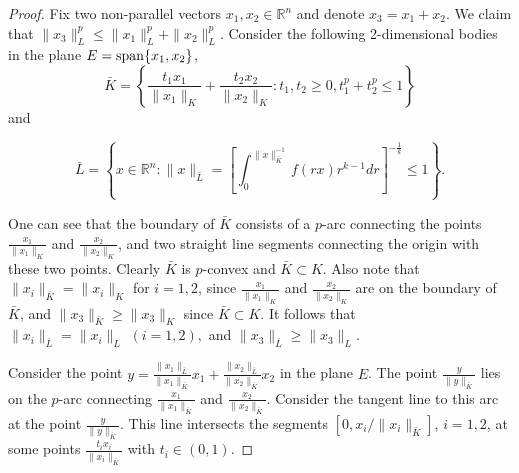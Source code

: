 \documentclass[12pt]{amsart} %
\renewcommand{\[}{\left[}
\renewcommand{\(}{\left(}
\renewcommand{\]}{\right]}
\renewcommand{\)}{\right)}
\renewcommand{\le}{\leqslant}
\renewcommand{\ge}{\geqslant}
\newcommand{\R}{\mathbb R}              %
\begin{document}
\begin{proof}
Fix two non-parallel vectors $x_1,x_2\in\R^n$ and denote $x_3=x_1+x_2$. We claim that $\|x_3\|_L^p \le \|x_1\|_L^p + \|x_2\|_L^p$. Consider the following 2-dimensional bodies in the plane $E={\rm span}\{x_1,x_2\}$,
$$
\bar{K}=\left\{\frac{t_1 x_1}{\|x_1\|_K}+\frac{t_2 x_2}{\|x_2\|_K}: t_1,t_2\ge 0, t_1^p +t_2^p \le 1\right\}
$$
and

 $$
\bar{L}=\left\{x\in\R^n: \|x\|_{\bar L} = \left[\int_0^{\|x\|_{\bar K}^{-1}} f(rx)r^{k-1}dr \right]^{-\frac 1k}\le 1 \right\}.
$$


One can see that the boundary of $\bar K$ consists of  a $p$-arc connecting the points  $\frac{x_1}{\|x_1\|_K}$ and $\frac{x_2}{\|x_2\|_K}$, and two straight line segments connecting the origin with these two points.  Clearly $\bar{K}$ is $p$-convex and $\bar{K}\subset K$. Also note that $\|x_i\|_{\bar K}=\|x_i\|_K$ for $i=1,2$, since $\frac{x_1}{\|x_1\|_K}$ and $\frac{x_2}{\|x_2\|_K}$ are on the boundary of $\bar{K}$, and $\|x_3\|_{\bar K} \ge \|x_3\|_K$ since $\bar{K}\subset K$. It follows that
$\|x_i\|_{\bar L}=\|x_i\|_L \,\, (i=1,2) , $ and $\|x_3\|_{\bar L} \ge \|x_3\|_L$.


 Consider the point $y = \frac{\|x_1\|_{\bar L}}{\|x_1\|_{\bar K}}x_1 + \frac{\|x_2\|_{\bar L}}{\|x_2\|_{\bar K}}x_2$ in the plane $E$. The point $\frac{y}{\|y\|_{\bar K}}$ lies on the $p$-arc connecting $\frac{x_1}{\|x_1\|_{\bar K}}$ and $\frac{x_2}{\|x_2\|_{\bar K}}$. Consider the tangent line to this arc at the point $\frac{y}{\|y\|_{\bar K}}$. This line intersects the segments $[0, {x_i}/{\|x_i\|_{\bar K}}]$, $i=1,2$, at some points
 $\frac{t_ix_i}{\|x_i\|_{\bar K}}$ with $t_i\in(0,1)$.



\end{proof}
\end{document}
